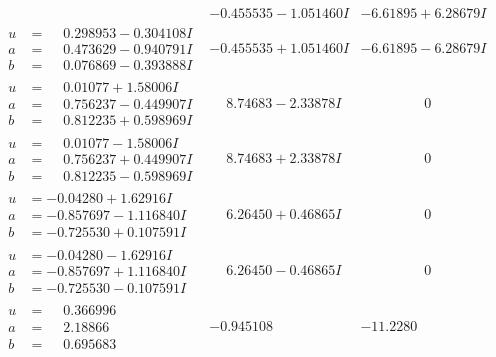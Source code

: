 \documentclass[1p]{elsarticle_modified}
\theoremstyle{definition}
\begin{document}
$$\begin{array}{c|c|c}
 & -0.455535 - 1.051460 I & -6.61895 + 6.28679 I \\ \hline\begin{aligned}
u &= \phantom{-}0.298953 - 0.304108 I \\
a &= \phantom{-}0.473629 - 0.940791 I \\
b &= \phantom{-}0.076869 - 0.393888 I\end{aligned}
 & -0.455535 + 1.051460 I & -6.61895 - 6.28679 I \\ \hline\begin{aligned}
u &= \phantom{-}0.01077 + 1.58006 I \\
a &= \phantom{-}0.756237 - 0.449907 I \\
b &= \phantom{-}0.812235 + 0.598969 I\end{aligned}
 & \phantom{-}8.74683 - 2.33878 I & \phantom{-0.000000 } 0 \\ \hline\begin{aligned}
u &= \phantom{-}0.01077 - 1.58006 I \\
a &= \phantom{-}0.756237 + 0.449907 I \\
b &= \phantom{-}0.812235 - 0.598969 I\end{aligned}
 & \phantom{-}8.74683 + 2.33878 I & \phantom{-0.000000 } 0 \\ \hline\begin{aligned}
u &= -0.04280 + 1.62916 I \\
a &= -0.857697 - 1.116840 I \\
b &= -0.725530 + 0.107591 I\end{aligned}
 & \phantom{-}6.26450 + 0.46865 I & \phantom{-0.000000 } 0 \\ \hline\begin{aligned}
u &= -0.04280 - 1.62916 I \\
a &= -0.857697 + 1.116840 I \\
b &= -0.725530 - 0.107591 I\end{aligned}
 & \phantom{-}6.26450 - 0.46865 I & \phantom{-0.000000 } 0 \\ \hline\begin{aligned}
u &= \phantom{-}0.366996\phantom{ +0.000000I} \\
a &= \phantom{-}2.18866\phantom{ +0.000000I} \\
b &= \phantom{-}0.695683\phantom{ +0.000000I}\end{aligned}
 & -0.945108\phantom{ +0.000000I} & -11.2280\phantom{ +0.000000I} \\ \hline\begin{aligned}

\end{aligned}
\end{array}$$
\end{document}

